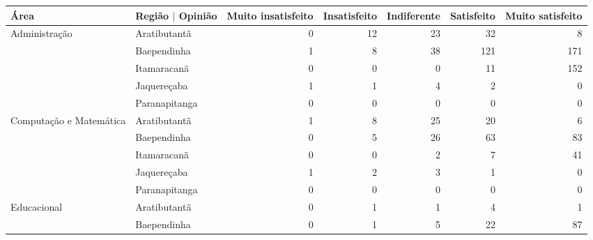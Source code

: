 \begin{table}[ht]
\centering
\begin{tabular}{ll rrrrr}
  \toprule
 Área                    & Região $\vert$ Opinião & \multicolumn{1}{l}{ Muito insatisfeito} & \multicolumn{1}{l}{ Insatisfeito} & \multicolumn{1}{l}{ Indiferente} & \multicolumn{1}{l}{ Satisfeito} & \multicolumn{1}{l}{ Muito satisfeito} \\ 
   \midrule
Administração           & Aratibutantã            &                  0 &           12 &          23 &         32 &                8 \\ 
                          & Baependinha             &                  1 &            8 &          38 &        121 &              171 \\ 
                          & Itamaracanã             &                  0 &            0 &           0 &         11 &              152 \\ 
                          & Jaquereçaba             &                  1 &            1 &           4 &          2 &                0 \\ 
                          & Paranapitanga           &                  0 &            0 &           0 &          0 &                0 \\ 
  Computação e Matemática & Aratibutantã            &                  1 &            8 &          25 &         20 &                6 \\ 
                          & Baependinha             &                  0 &            5 &          26 &         63 &               83 \\ 
                          & Itamaracanã             &                  0 &            0 &           2 &          7 &               41 \\ 
                          & Jaquereçaba             &                  1 &            2 &           3 &          1 &                0 \\ 
                          & Paranapitanga           &                  0 &            0 &           0 &          0 &                0 \\ 
  Educacional             & Aratibutantã            &                  0 &            1 &           1 &          4 &                1 \\ 
                          & Baependinha             &                  0 &            1 &           5 &         22 &               87 \\ 

\end{tabular}
\end{table}
